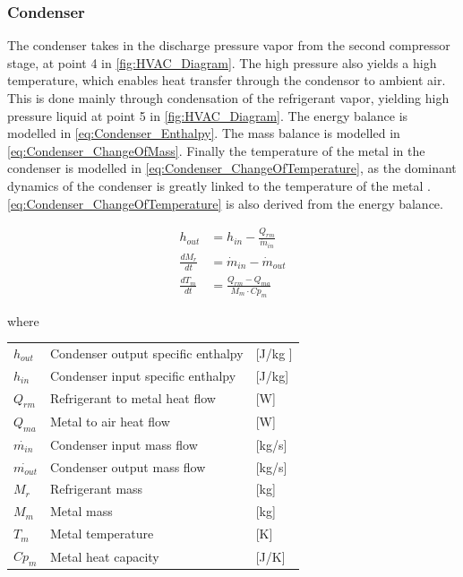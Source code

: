 \subsubsection{Condenser}

The condenser takes in the discharge pressure vapor from the second compressor stage, at point 4 in \cref{fig:HVAC_Diagram}. The high pressure also yields a high temperature,
which enables heat transfer through the condensor to ambient air. This is done mainly through condensation of the refrigerant vapor, yielding high pressure liquid at point 5 in \cref{fig:HVAC_Diagram}.
The energy balance is modelled in \cref{eq:Condenser_Enthalpy}. The mass balance is modelled in \cref{eq:Condenser_ChangeOfMass}. Finally the temperature of the metal in the condenser is modelled in
\cref{eq:Condenser_ChangeOfTemperature}, as the dominant dynamics of the condenser is greatly linked to the temperature of the metal \cite{Sorensen2013}. \cref{eq:Condenser_ChangeOfTemperature} is also
derived from the energy balance.

\begin{align}
	h_{out} 			& = h_{in} - \frac{Q_{rm}}{\dot{m}_{in}}  	\label{eq:Condenser_Enthalpy} \\
	\frac{dM_r}{dt} 	& = \dot{m}_{in} - \dot{m}_{out} 				\label{eq:Condenser_ChangeOfMass}\\
	\frac{dT_m}{dt} 	& = \frac{Q_{rm} - Q_{ma}}{M_m \cdot Cp_m}		\label{eq:Condenser_ChangeOfTemperature}
\end{align}

where

\begin{center}
	\begin{tabular}{l p{8cm} l}
		$h_{out}$				&  Condenser output specific enthalpy			& [\si{J}/\si{kg} ]\\
		$h_{in}$					&  Condenser input specific enthalpy 			& [\si{J}/\si{kg}] \\
		$Q_{rm}$					& Refrigerant to metal heat flow 			& [\si{W}] \\
		$Q_{ma}$					& Metal to air heat flow						& [\si{W}] \\
		$\dot{m_{in}}$			& Condenser input mass flow 			& [\si{kg}/\si{s}] \\
		$\dot{m_{out}}$			& Condenser output mass flow 		& [\si{kg}/\si{s}] \\
		$M_r$						& Refrigerant mass 								& [\si{kg}] \\
		$M_m$						& Metal mass												& [\si{kg}] \\
		$T_m$						& Metal temperature 							& [\si{K}]\\
		$Cp_m$					& Metal heat capacity 						& [\si{J}/\si{K}]\\
	\end{tabular}
\end{center}

